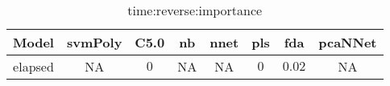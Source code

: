 \begin{table}[!ht]
	\centering
	\begin{tabular}{|c|c|c|c|c|c|c|c|}
		\hline
		Model & svmPoly & C5.0 & nb & nnet & pls & fda & pcaNNet \\ \hline
		elapsed & NA & $0$ & NA & NA & $0$ & $0.02$ & NA \\ \hline
	\end{tabular}
	\caption{time:reverse:importance}
	\label{tab:time:reverse:importance}
\end{table}
